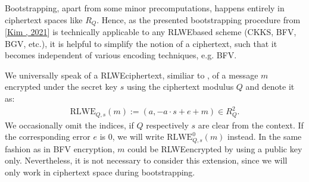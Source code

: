\documentclass[letterpaper,10pt,english]{jupyterBook}
\begin{document}
\begin{DUlineblock}{0em}
\item[] 
\end{DUlineblock}

\sphinxAtStartPar
Bootstrapping, apart from some minor precomputations, happens entirely in ciphertext spaces like \(R_Q\).
Hence, as the presented bootstrapping procedure from {[}\hyperlink{cite.Thesis:id72}{Kim , 2021}{]} is technically applicable to any RLWE\sphinxhyphen{}based scheme (CKKS, BFV, BGV, etc.), it is helpful to simplify the notion of a ciphertext, such that it becomes independent of various encoding techniques, e.g. BFV.

\sphinxAtStartPar
We universally speak of a RLWE\sphinxhyphen{}ciphertext, similiar to {\hyperref[\detokenize{Thesis:RLWE-distribution}]{}}, of a message \(m\) encrypted under the secret key \(s\) using the ciphertext modulus \(Q\) and denote it as:
\begin{equation*}
\begin{split}
\mathrm{RLWE}_{Q,s}(m) := (a, -a\cdot s+e+m) \in R_Q^2.
\end{split}
\end{equation*}
\sphinxAtStartPar
We occasionally omit the indices, if \(Q\) respectively \(s\) are clear from the context.
If the corresponding error \(e\) is \(0\), we will write \(\mathrm{RLWE}_{Q,s}^0(m)\) instead.
In the same fashion as in BFV encryption, \(m\) could be RLWE\sphinxhyphen{}encrypted by using a public key only.
Nevertheless, it is not necessary to consider this extension, since we will only work in ciphertext space during bootstrapping.
\end{document}
